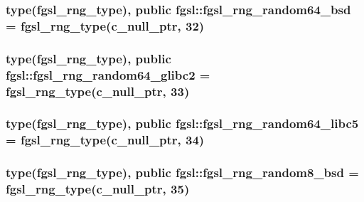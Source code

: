 \subsubsection[{fgsl\+\_\+rng\+\_\+random64\+\_\+bsd}]{\setlength{\rightskip}{0pt plus 5cm}type({\bf fgsl\+\_\+rng\+\_\+type}), public fgsl\+::fgsl\+\_\+rng\+\_\+random64\+\_\+bsd = {\bf fgsl\+\_\+rng\+\_\+type}(c\+\_\+null\+\_\+ptr, 32)}\label{namespacefgsl_a4f1fadb8ae8e69bc97fa0ce10b8c2669}
\hypertarget{namespacefgsl_afa30a9f9486fc4a3ebc5c98fdf7c2734}{}
\subsubsection[{fgsl\+\_\+rng\+\_\+random64\+\_\+glibc2}]{\setlength{\rightskip}{0pt plus 5cm}type({\bf fgsl\+\_\+rng\+\_\+type}), public fgsl\+::fgsl\+\_\+rng\+\_\+random64\+\_\+glibc2 = {\bf fgsl\+\_\+rng\+\_\+type}(c\+\_\+null\+\_\+ptr, 33)}\label{namespacefgsl_afa30a9f9486fc4a3ebc5c98fdf7c2734}
\hypertarget{namespacefgsl_a5d485fce442bdf380a13906f23f519cb}{}
\subsubsection[{fgsl\+\_\+rng\+\_\+random64\+\_\+libc5}]{\setlength{\rightskip}{0pt plus 5cm}type({\bf fgsl\+\_\+rng\+\_\+type}), public fgsl\+::fgsl\+\_\+rng\+\_\+random64\+\_\+libc5 = {\bf fgsl\+\_\+rng\+\_\+type}(c\+\_\+null\+\_\+ptr, 34)}\label{namespacefgsl_a5d485fce442bdf380a13906f23f519cb}
\hypertarget{namespacefgsl_a03a999d95485529c23b1eeb38284dd6a}{}
\subsubsection[{fgsl\+\_\+rng\+\_\+random8\+\_\+bsd}]{\setlength{\rightskip}{0pt plus 5cm}type({\bf fgsl\+\_\+rng\+\_\+type}), public fgsl\+::fgsl\+\_\+rng\+\_\+random8\+\_\+bsd = {\bf fgsl\+\_\+rng\+\_\+type}(c\+\_\+null\+\_\+ptr, 35)}\label{namespacefgsl_a03a999d95485529c23b1eeb38284dd6a}
\hypertarget{namespacefgsl_a6028caefc0e3a940d1ee57801f7fd438}{}
